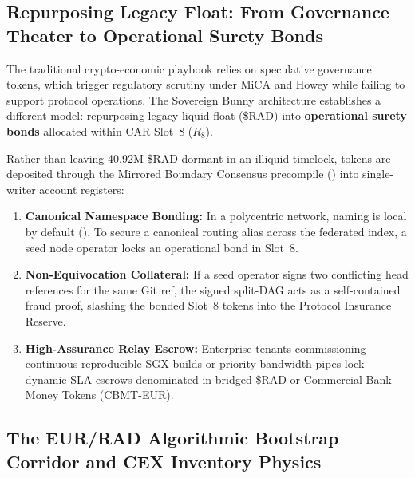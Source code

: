 \documentclass[a4paper,11pt,twoside,parskip=half-,headings=small]{scrartcl}
\begin{document}
\subsection{Repurposing Legacy Float: From Governance Theater to Operational Surety Bonds}
\label{sec:repurposing_rad_float}

The traditional crypto-economic playbook relies on speculative governance tokens, which trigger regulatory scrutiny under MiCA and Howey while failing to support protocol operations. The Sovereign Bunny architecture establishes a different model: repurposing legacy liquid float (\$RAD) into \textbf{operational surety bonds} allocated within CAR Slot~8 ($R_8$).

Rather than leaving 40.92M \$RAD dormant in an illiquid timelock, tokens are deposited through the Mirrored Boundary Consensus precompile () into single-writer account registers:
\begin{enumerate}
  \item \textbf{Canonical Namespace Bonding:} In a polycentric network, naming is local by default (). To secure a canonical routing alias across the federated index, a seed node operator locks an operational bond in Slot~8.
  \item \textbf{Non-Equivocation Collateral:} If a seed operator signs two conflicting head references for the same Git ref, the signed split-DAG acts as a self-contained fraud proof, slashing the bonded Slot~8 tokens into the Protocol Insurance Reserve.
  \item \textbf{High-Assurance Relay Escrow:} Enterprise tenants commissioning continuous reproducible SGX builds or priority bandwidth pipes lock dynamic SLA escrows denominated in bridged \$RAD or Commercial Bank Money Tokens (CBMT-EUR).
\end{enumerate}

\subsection{The EUR/RAD Algorithmic Bootstrap Corridor and CEX Inventory Physics}
\label{sec:bootstrap_corridor}
\end{document}
